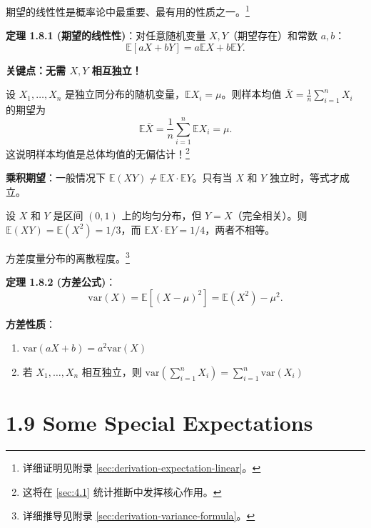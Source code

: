 期望的线性性是概率论中最重要、最有用的性质之一。\footnote{详细证明见附录 \cref{sec:derivation-expectation-linear}。}

\begin{remark}
\textbf{定理 1.8.1 (期望的线性性)}：对任意随机变量 $X, Y$（期望存在）和常数 $a, b$：
\[
\mathbb{E}[aX + bY] = a\mathbb{E}X + b\mathbb{E}Y.
\label{eq:expectation-linearity-ch1}
\]

\textbf{关键点：无需 $X, Y$ 相互独立！}
\end{remark}

\begin{example}[样本均值]\label{ex:sample-mean-ch1}
设 $X_1, \ldots, X_n$ 是独立同分布的随机变量，$\mathbb{E}X_i = \mu$。则样本均值 $\bar{X} = \frac{1}{n}\sum_{i=1}^n X_i$ 的期望为
\[
\mathbb{E}\bar{X} = \frac{1}{n}\sum_{i=1}^n \mathbb{E}X_i = \mu.
\]
这说明样本均值是总体均值的无偏估计！\footnote{这将在 \cref{sec:4.1} 统计推断中发挥核心作用。}
\end{example}

\textbf{乘积期望}：一般情况下 $\mathbb{E}(XY) \neq \mathbb{E}X \cdot \mathbb{E}Y$。只有当 $X$ 和 $Y$ 独立时，等式才成立。

\begin{example}[乘积期望]\label{ex:product-expectation-ch1}
设 $X$ 和 $Y$ 是区间 $(0, 1)$ 上的均匀分布，但 $Y = X$（完全相关）。则 $\mathbb{E}(XY) = \mathbb{E}(X^2) = 1/3$，而 $\mathbb{E}X \cdot \mathbb{E}Y = 1/4$，两者不相等。
\end{example}

方差度量分布的离散程度。\footnote{详细推导见附录 \cref{sec:derivation-variance-formula}。}

\begin{remark}
\textbf{定理 1.8.2 (方差公式)}：
\[
\text{var}(X) = \mathbb{E}[(X - \mu)^2] = \mathbb{E}(X^2) - \mu^2.
\label{eq:variance-formula-ch1}
\]

\textbf{方差性质}：
\begin{enumerate}
    \item $\text{var}(aX + b) = a^2 \text{var}(X)$
    \item 若 $X_1, \ldots, X_n$ 相互独立，则 $\text{var}\left(\sum_{i=1}^{n} X_i\right) = \sum_{i=1}^{n} \text{var}(X_i)$
\end{enumerate}
\end{remark}

\section{1.9 Some Special Expectations}\label{sec:1.9}


